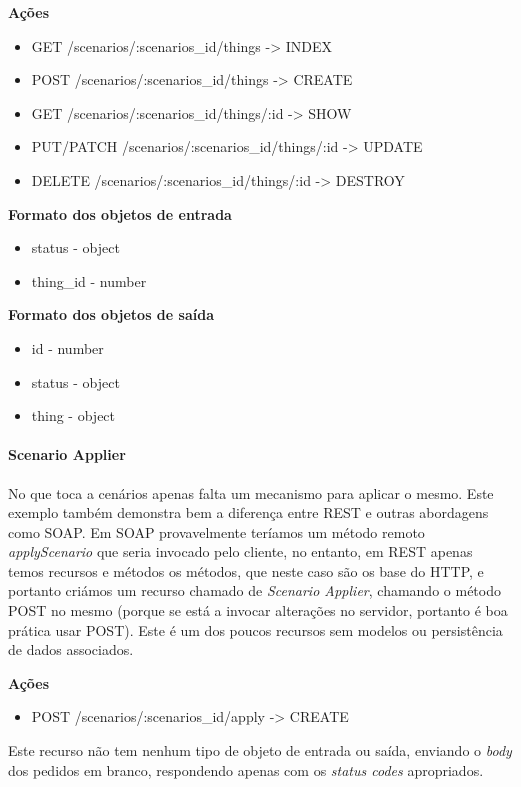 \textbf{Ações}
\begin{itemize}
    \item GET /scenarios/:scenarios{\_}id/things -> INDEX
    \item POST /scenarios/:scenarios{\_}id/things -> CREATE
    \item GET /scenarios/:scenarios{\_}id/things/:id -> SHOW
    \item PUT/PATCH /scenarios/:scenarios{\_}id/things/:id -> UPDATE
    \item DELETE /scenarios/:scenarios{\_}id/things/:id -> DESTROY
\end{itemize}

\textbf{Formato dos objetos de entrada}
\begin{itemize}
    \item status - object
    \item thing{\_}id - number
\end{itemize}

\textbf{Formato dos objetos de saída}
\begin{itemize}
    \item id - number
    \item status - object
    \item thing - object
\end{itemize}

\paragraph*{Scenario Applier}

No que toca a cenários apenas falta um mecanismo para aplicar o mesmo. Este exemplo também demonstra bem a diferença entre REST e outras abordagens como SOAP. Em SOAP provavelmente teríamos um método remoto \textit{applyScenario} que seria invocado pelo cliente, no entanto, em REST apenas temos recursos e métodos os métodos, que neste caso são os base do HTTP, e portanto criámos um recurso chamado de \textit{Scenario Applier}, chamando o método POST no mesmo (porque se está a invocar alterações no servidor, portanto é boa prática usar POST). Este é um dos poucos recursos sem modelos ou persistência de dados associados.

\textbf{Ações}
\begin{itemize}
    \item POST /scenarios/:scenarios{\_}id/apply -> CREATE
\end{itemize}

Este recurso não tem nenhum tipo de objeto de entrada ou saída, enviando o \textit{body} dos pedidos em branco, respondendo apenas com os \textit{status codes} apropriados.

